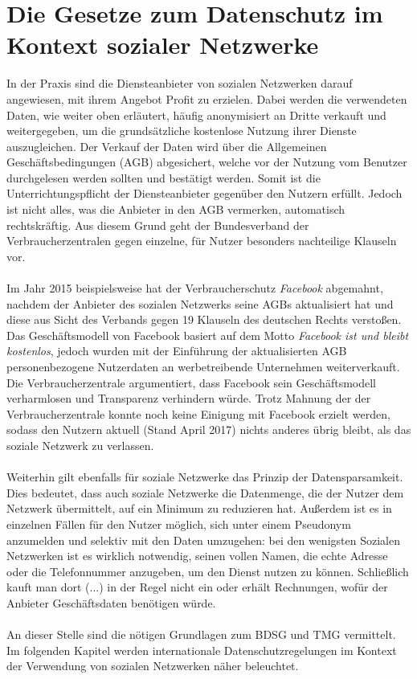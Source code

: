 \section{Die Gesetze zum Datenschutz im Kontext sozialer Netzwerke}
In der Praxis sind die Diensteanbieter von sozialen Netzwerken darauf angewiesen, mit ihrem Angebot Profit zu erzielen. Dabei werden die verwendeten Daten, wie weiter oben erläutert, häufig anonymisiert an Dritte verkauft und weitergegeben, um die grundsätzliche kostenlose Nutzung ihrer Dienste auszugleichen. Der Verkauf der Daten wird über die Allgemeinen Geschäftsbedingungen (\acs{AGB}) abgesichert, welche vor der Nutzung vom Benutzer durchgelesen werden sollten und bestätigt werden. Somit ist die Unterrichtungspflicht der Diensteanbieter gegenüber den Nutzern erfüllt. Jedoch ist nicht alles, was die Anbieter in den AGB vermerken, automatisch rechtskräftig. Aus diesem Grund geht der Bundesverband der Verbraucherzentralen gegen einzelne, für Nutzer besonders nachteilige Klauseln vor.\autocite[vgl.][]{klicksafe.de2}\\
\\Im Jahr 2015 beispielsweise hat der Verbraucherschutz \textit{Facebook} abgemahnt, nachdem der Anbieter des sozialen Netzwerks seine AGBs aktualisiert hat und diese aus Sicht des Verbands gegen 19 Klauseln des deutschen Rechts verstoßen. Das Geschäftsmodell von Facebook basiert auf dem Motto \textit{Facebook ist und bleibt kostenlos}, jedoch wurden mit der Einführung der aktualisierten AGB personenbezogene Nutzerdaten an werbetreibende Unternehmen weiterverkauft. Die Verbraucherzentrale argumentiert, dass Facebook sein Geschäftsmodell verharmlosen und Transparenz verhindern würde. Trotz Mahnung der der Verbraucherzentrale konnte noch keine Einigung mit Facebook erzielt werden, sodass den Nutzern aktuell (Stand April 2017) nichts anderes übrig bleibt, als das soziale Netzwerk zu verlassen.\autocite[vgl.][]{SpiegelOnline} \autocite[vgl.][]{Verbraucherzentrale}\\
\\Weiterhin gilt ebenfalls für soziale Netzwerke das Prinzip der Datensparsamkeit. Dies bedeutet, dass auch soziale Netzwerke die Datenmenge, die der Nutzer dem Netzwerk übermittelt, auf ein Minimum zu reduzieren hat. Außerdem ist es in einzelnen Fällen für den Nutzer möglich, sich unter einem Pseudonym anzumelden und selektiv mit den Daten umzugehen: \glqq bei den wenigsten Sozialen Netzwerken ist es wirklich notwendig, seinen vollen Namen, die echte Adresse oder die Telefonnummer anzugeben, um den Dienst nutzen zu können. Schließlich kauft man dort (...) in der Regel nicht ein oder erhält Rechnungen, wofür der Anbieter Geschäftsdaten benötigen würde.\grqq \autocite[][]{klicksafe.de2} \autocite[vgl.][]{klicksafe.de2}\\
\\An dieser Stelle sind die nötigen Grundlagen zum BDSG und TMG vermittelt. Im folgenden Kapitel werden internationale Datenschutzregelungen im Kontext der Verwendung von sozialen Netzwerken näher beleuchtet.